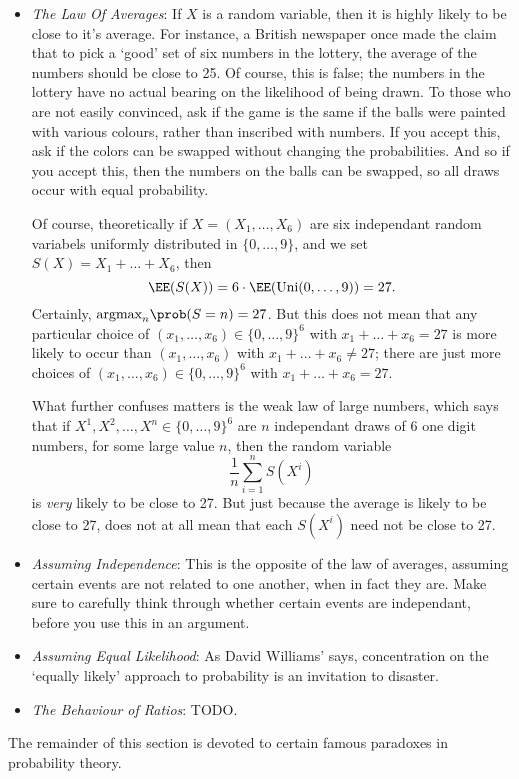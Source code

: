\begin{itemize}
    \item {\it The Law Of Averages}: If $X$ is a random variable, then it is highly likely to be close to it's average. For instance, a British newspaper once made the claim that to pick a `good' set of six numbers in the lottery, the average of the numbers should be close to 25. Of course, this is false; the numbers in the lottery have no actual bearing on the likelihood of being drawn. To those who are not easily convinced, ask if the game is the same if the balls were painted with various colours, rather than inscribed with numbers. If you accept this, ask if the colors can be swapped without changing the probabilities. And so if you accept this, then the numbers on the balls can be swapped, so all draws occur with equal probability.

    Of course, theoretically if $X = (X_1, \dots, X_6)$ are six independant random variabels uniformly distributed in $\{ 0, \dots, 9 \}$, and we set $S(X) = X_1 + \dots + X_6$, then
    \[ \EE(S(X)) = 6 \cdot \EE(\text{Uni}(0,\dots,9)) = 27. \]
    Certainly, $\text{argmax}_n \prob(S = n) = 27$. But this does not mean that any particular choice of $(x_1, \dots, x_6) \in \{ 0, \dots, 9 \}^6$ with $x_1 + \dots + x_6 = 27$ is more likely to occur than $(x_1, \dots, x_6)$ with $x_1 + \dots + x_6 \neq 27$; there are just more choices of $(x_1, \dots, x_6) \in \{ 0, \dots, 9 \}^6$ with $x_1 + \dots + x_6 = 27$.

    What further confuses matters is the weak law of large numbers, which says that if $X^1, X^2, \dots, X^n \in \{ 0, \dots, 9 \}^6$ are $n$ independant draws of 6 one digit numbers, for some large value $n$, then the random variable
    \[ \frac{1}{n} \sum_{i = 1}^n S(X^i) \]
    is {\it very} likely to be close to 27. But just because the average is likely to be close to 27, does not at all mean that each $S(X^i)$ need not be close to 27.

    \item {\it Assuming Independence}: This is the opposite of the law of averages, assuming certain events are not related to one another, when in fact they are. Make sure to carefully think through whether certain events are independant, before you use this in an argument.

    \item {\it Assuming Equal Likelihood}: As David Williams' says, concentration on the `equally likely' approach to probability is an invitation to disaster.

    \item {\it The Behaviour of Ratios}: TODO.
\end{itemize}
%
The remainder of this section is devoted to certain famous paradoxes in probability theory.

